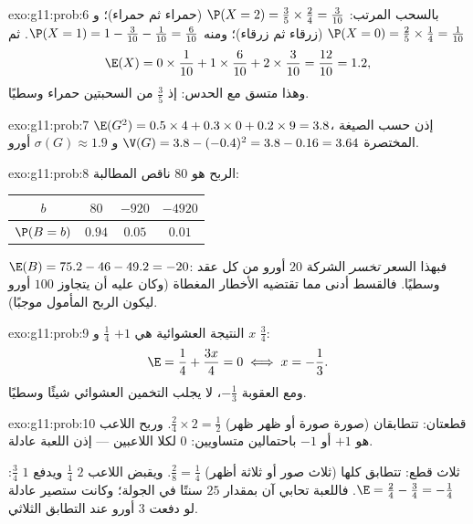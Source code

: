 \begin{solution}{exo:g11:prob:6}
بالسحب المرتب: $\P(X = 2) = \frac35 \times \frac24 = \frac{3}{10}$
(حمراء ثم حمراء)؛ و $\P(X = 0) = \frac25 \times \frac14 = \frac{1}{10}$
(زرقاء ثم زرقاء)؛ ومنه
$\P(X = 1) = 1 - \frac{3}{10} - \frac{1}{10} = \frac{6}{10}$. ثم
\[
\E(X) = 0 \times \frac1{10} + 1 \times \frac6{10} + 2 \times \frac3{10}
= \frac{12}{10} = 1.2 ,
\]
وهذا متسق مع الحدس: إذ $\frac35$ من السحبتين حمراء وسطيًا.
\end{solution}

\begin{solution}{exo:g11:prob:7}
$\E(G^2) = 0.5 \times 4 + 0.3 \times 0 + 0.2 \times 9 = 3.8$، إذن حسب
الصيغة المختصرة
$\V(G) = 3.8 - (-0.4)^2 = 3.8 - 0.16 = 3.64$ و
$\sigma(G) \approx 1.9$ أورو.
\end{solution}

\begin{solution}{exo:g11:prob:8}
الربح هو $80$ ناقص المطالبة:
\begin{center}
\begin{tabular}{c|ccc}
$b$ & $80$ & $-920$ & $-4920$\\
\hline
$\P(B=b)$ & $0.94$ & $0.05$ & $0.01$
\end{tabular}
\end{center}
$\E(B) = 75.2 - 46 - 49.2 = -20$: فبهذا السعر \emph{تخسر} الشركة
$20$ أورو من كل عقد وسطيًا. فالقسط أدنى مما تقتضيه الأخطار
المغطاة (وكان عليه أن يتجاوز $100$ أورو ليكون الربح المأمول
موجبًا).
\end{solution}

\begin{solution}{exo:g11:prob:9}
النتيجة العشوائية هي $+1$  $\frac14$ و $x$
 $\frac34$:
\[
\E = \frac14 + \frac{3x}{4} = 0 \iff x = -\frac13 .
\]
ومع العقوبة $-\frac13$، لا يجلب التخمين العشوائي شيئًا وسطيًا.
\end{solution}

\begin{solution}{exo:g11:prob:10}
قطعتان: تتطابقان (صورة صورة أو ظهر ظهر)  $\frac24 \times 2 =
\frac12$. وربح اللاعب هو $+1$ أو $-1$ باحتمالين متساويين:
 $0$ لكلا اللاعبين --- إذن اللعبة عادلة.

ثلاث قطع: تتطابق كلها (ثلاث صور أو ثلاثة أظهر)  $\frac{2}{8} =
\frac14$. ويقبض اللاعب $2$  $\frac14$ ويدفع $1$
 $\frac34$:
$\E = \frac24 - \frac34 = -\frac14$. فاللعبة تحابي آن بمقدار $25$ سنتًا
في الجولة؛ وكانت ستصير عادلة لو دفعت $3$ أورو عند التطابق الثلاثي.
\end{solution}

